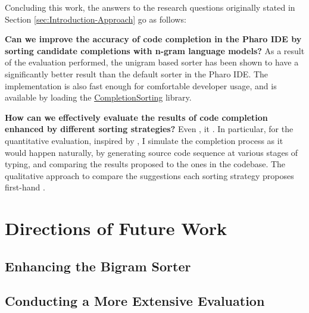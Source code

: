 Concluding this work, the answers to the research questions originally stated in Section \ref{sec:Introduction-Approach} go as follows:
\begin{RQ}
    \item \textbf{Can we improve the accuracy of code completion in the Pharo IDE by sorting candidate completions with n-gram language models?} As a result of the evaluation performed, the unigram based sorter has been shown to have a significantly better result than the default sorter in the Pharo IDE. The implementation is also fast enough for comfortable developer usage, and is available by loading the \href{https://github.com/myroslavarm/CompletionSorting}{CompletionSorting} library. 
    \item \textbf{How can we effectively evaluate the results of code completion enhanced by different sorting strategies?} Even  , it .  In particular, for the quantitative evaluation, inspired by \cite{Robb08a}, I  simulate the completion process as it would happen naturally, by generating source code sequence at various stages of typing, and comparing the results proposed to the ones in the codebase. The qualitative approach  to compare the suggestions each sorting strategy proposes first-hand .
\end{RQ}

\section{Directions of Future Work}
\label{sec:Conclusion-FutureWork}
\subsection{Enhancing the Bigram Sorter}

\subsection{Conducting a More Extensive Evaluation}